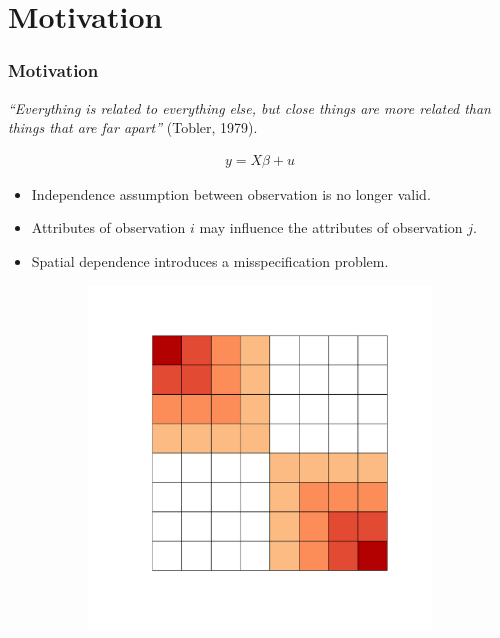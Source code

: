 \documentclass[
  shownotes,
  xcolor={svgnames},
  hyperref={colorlinks,citecolor=DarkBlue,linkcolor=DarkRed,urlcolor=DarkBlue}
  , aspectratio=169]{beamer}
\begin{document}
\section{Motivation }
\begin{frame}[fragile]
\frametitle{Motivation}


{\it “Everything is related to everything else, but close things are more related than things that are far apart”} (Tobler, 1979).


    \begin{minipage}[t]{0.52\linewidth}

\begin{align}
        y = X\beta + u \nonumber
    \end{align}

\begin{itemize}
    
  \small
  \item Independence assumption between observation is no longer valid.
  
  \item Attributes of observation $i$  may influence the attributes of observation $j$.

  \item Spatial dependence introduces a misspecification problem.
  
  
\end{itemize}

    \end{minipage}
    \hfill
    \begin{minipage}[t]{0.43\linewidth}%
       \medskip
        \begin{figure}[H] 
          \begin{subfigure}{0.45\linewidth}
          \includegraphics[scale=.21]{figures/spatial_correlation.pdf}
          \end{subfigure} \\
          

\end{figure}
\end{minipage}
\end{frame}
\end{document}
